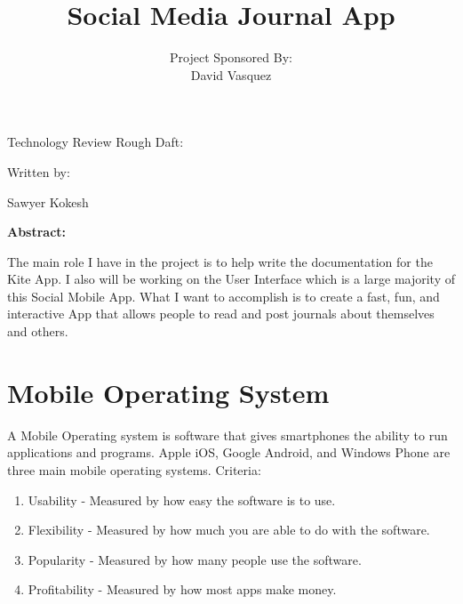 \documentclass[letterpaper, 10, draftclsnofoot, onecolumn]{IEEEtran}
\title{Social Media Journal App}
\author{ %
	Project Sponsored By: \\
    David Vasquez
}
\begin{document}
\null  %
\nointerlineskip  %
\vfill
\let\snewpage \newpage
\let\newpage \relax
\maketitle
\begin{center}
\huge{Technology Review Rough Daft:}\par
\vspace{2mm}
\large{Written by:}\par
\normalsize{Sawyer Kokesh}\par
\vspace{8mm}
\large{\textbf{Abstract:}}\par 
\vspace{2mm}
\normalsize{The main role I have in the project is to help write the documentation for the Kite App. I also will be working on the User Interface which is a large majority of this Social Mobile App. What I want to accomplish is to create a fast, fun, and interactive App that allows people to read and post journals about themselves and others.}
\end{center}
\let \newpage \snewpage
\vfill 
\break %

\setlength\parindent{4mm}
\section*{Mobile Operating System}\par
\indent A Mobile Operating system is software that gives smartphones the ability to run applications and programs. Apple iOS, Google Android, and Windows Phone are three main mobile operating systems.
\newline
Criteria:
\begin{enumerate}
\item Usability - Measured by how easy the software is to use.
\item Flexibility - Measured by how much you are able to do with the software. 
\item Popularity - Measured by how many people use the software.
\item Profitability - Measured by how most apps make money.
\end{enumerate}
\end{document}
